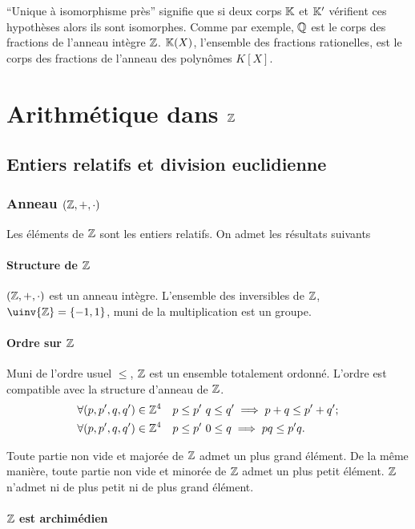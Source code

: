 ``Unique à isomorphisme près'' signifie que si deux corps $\mathbb{K}$ et $\mathbb{K}'$ vérifient ces hypothèses alors ils sont isomorphes. Comme par exemple, $\mathbb{Q}$ est le corps des fractions de l'anneau intègre $\mathbb{Z}$. $\mathbb{K}(X)$, l'ensemble des fractions rationelles, est le corps des fractions de l'anneau des polynômes $K[X]$.

\section{Arithmétique dans $\mathbb{Z}$}

\subsection{Entiers relatifs et division euclidienne}

\subsubsection{Anneau $(\mathbb{Z},+,\cdot)$}

Les éléments de $\mathbb{Z}$ sont les entiers relatifs. On admet les résultats suivants

\paragraph{Structure de $\mathbb{Z}$}

$(\mathbb{Z},+,\cdot)$ est un anneau intègre. L'ensemble des inversibles de $\mathbb{Z}$, $\uinv{\Z}=\{-1,1\}$, muni de la multiplication est un groupe.

\paragraph{Ordre sur $\mathbb{Z}$}

Muni de l'ordre usuel $\leq$, $\mathbb{Z}$ est un ensemble totalement ordonné. L'ordre est compatible avec la structure d'anneau de $\mathbb{Z}$.
\begin{align}
  \forall (p,p',q,q') \in \mathbb{Z}^4 &\quad p \leq p' \ q \leq q' \implies p+q \leq p'+q';\\
  \forall (p,p',q,q') \in \mathbb{Z}^4 &\quad p \leq p' \ 0 \leq q \implies pq \leq p'q.
\end{align}

Toute partie non vide et majorée de $\mathbb{Z}$ admet un plus grand élément. De la même manière, toute partie non vide et minorée de $\mathbb{Z}$ admet un plus petit élément. $\mathbb{Z}$ n'admet ni de plus petit ni de plus grand élément.

\paragraph{$\mathbb{Z}$ est archimédien}

